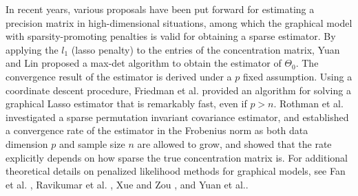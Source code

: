 \documentclass[review]{elsarticle}
\newcommand{\1}{{\bf 1}}
\newcommand{\0}{{\bf 0}}
\begin{document}
 In recent years, various proposals have been put forward for estimating a precision matrix in high-dimensional situations, among which the graphical model with sparsity-promoting penalties is valid for obtaining a sparse estimator.
 By applying the $l_1$ (lasso penalty) to the entries of the concentration matrix, Yuan and Lin \cite{yuan2007model} proposed a max-det algorithm to obtain the estimator of $\Theta_0$. The convergence result of the estimator is derived under a $p$ fixed assumption.
 Using a coordinate descent procedure, Friedman et al. \cite{friedman2008sparse} provided an algorithm for solving a graphical Lasso estimator that is remarkably fast, even if $p>n$.
 Rothman et al. \cite{Rothman2008Sparse} investigated a sparse permutation invariant covariance estimator, and
 established a convergence rate of the estimator in the Frobenius norm as both data dimension $p$ and sample size $n$ are allowed to grow, and showed that the rate explicitly depends on how sparse the true concentration matrix is.
 For additional theoretical details on penalized likelihood methods for graphical models, see Fan et al. \cite{fan2009network}, Ravikumar et al. \cite{ravikumar2011high}, Xue and Zou \cite{xue2012regularized}, and Yuan et al.\cite{yuan2019constrained}.
\end{document}

